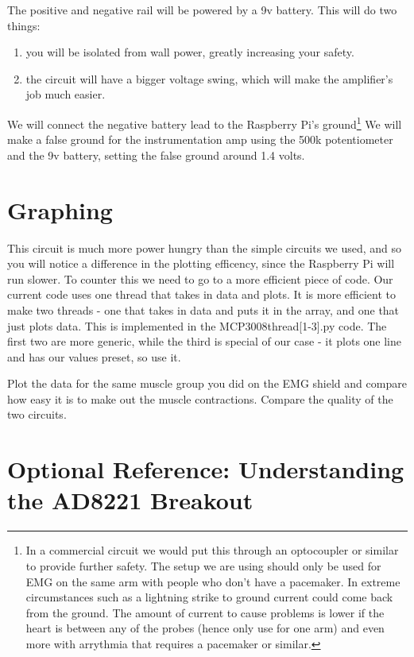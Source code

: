 The positive and negative rail will be powered by a 9v battery. This will do two things:
\begin{enumerate}
\item you will be isolated from wall power, greatly increasing your safety.
\item the circuit will have a bigger voltage swing, which will make the amplifier's job much easier.
\end{enumerate}
We will connect the negative battery lead to the Raspberry Pi's ground\footnote{In a commercial circuit we would put this through an optocoupler or similar to provide further safety.  The setup we are using should only be used for EMG on the same arm with people who don't have a pacemaker. In extreme circumstances such as a lightning strike to ground current could come back from the ground.  The amount of current to cause problems is lower if the heart is between any of the probes (hence only use for one arm) and even more with arrythmia that requires a pacemaker or similar.} We will make a false ground for the instrumentation amp using the 500k potentiometer and the 9v battery, setting the false ground around 1.4 volts.

\section{Graphing}

This circuit is much more power hungry than the simple circuits we used, and so you will notice a difference in the plotting efficency, since the Raspberry Pi will run slower.  To counter this we need to go to a more efficient piece of code.  Our current code uses one thread that takes in data and plots.  It is more efficient to make two threads - one that takes in data and puts it in the array, and one that just plots data.  This is implemented in the MCP3008thread[1-3].py code.  The first two are more generic, while the third is special of our case - it plots one line and has our values preset, so use it.



Plot the data for the same muscle group you did on the EMG shield and compare how easy it is to make out the muscle contractions.  Compare the quality of the two circuits.

\section{Optional Reference: Understanding the AD8221 Breakout}

